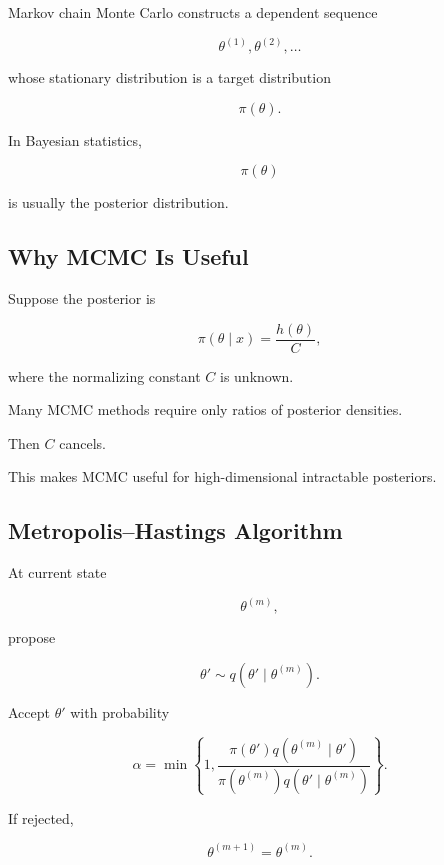 Markov chain Monte Carlo constructs a dependent sequence

\[
\boxed{
\theta^{(1)},
\theta^{(2)},
\ldots
}
\]

whose stationary distribution is a target distribution

\[
\pi(\theta).
\]

In Bayesian statistics,

\[
\pi(\theta)
\]

is usually the posterior distribution.

\subsection{Why MCMC Is Useful}
\label{subsec:why-mcmc-useful}

Suppose the posterior is

\[
\pi(\theta\mid x)
=
\frac{
h(\theta)
}{
C
},
\]

where the normalizing constant \(C\) is unknown.

Many MCMC methods require only ratios of posterior densities.

Then \(C\) cancels.

This makes MCMC useful for high-dimensional intractable posteriors.

\subsection{Metropolis--Hastings Algorithm}
\label{subsec:metropolis-hastings-computational}

At current state

\[
\theta^{(m)},
\]

propose

\[
\theta'
\sim
q
(
\theta'\mid\theta^{(m)}
).
\]

Accept \(\theta'\) with probability

\[
\boxed{
\alpha
=
\min
\left\{
1,
\frac{
\pi(\theta')
q
(
\theta^{(m)}\mid\theta'
)
}{
\pi
(
\theta^{(m)}
)
q
(
\theta'\mid\theta^{(m)}
)
}
\right\}.
}
\]

If rejected,

\[
\boxed{
\theta^{(m+1)}
=
\theta^{(m)}.
}
\]

